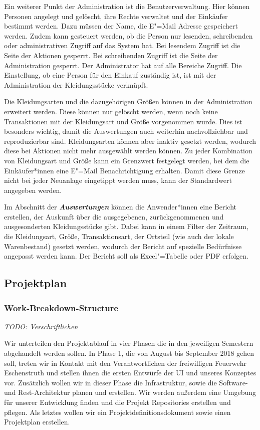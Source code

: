 Ein weiterer Punkt der Administration ist die Benutzerverwaltung. Hier können Personen angelegt und gelöscht, ihre Rechte verwaltet und der Einkäufer bestimmt werden. Dazu müssen der Name, die E"=Mail Adresse gespeichert werden. Zudem kann gesteuert werden, ob die Person nur lesenden, schreibenden oder administrativen Zugriff auf das System hat. Bei lesendem Zugriff ist die Seite der Aktionen gesperrt. Bei schreibenden Zugriff ist die Seite der Administration gesperrt. Der Administrator hat auf alle Bereiche Zugriff. Die Einstellung, ob eine Person für den Einkauf zuständig ist, ist mit der Administration der Kleidungsstücke verknüpft. 

Die Kleidungsarten und die dazugehörigen Größen können in der Administration erweitert werden. Diese können nur gelöscht werden, wenn noch keine Transaktionen mit der Kleidungsart und Größe vorgenommen wurde. Dies ist besonders wichtig, damit die Auswertungen auch weiterhin nachvollziehbar und reproduzierbar sind. Kleidungsarten können aber inaktiv gesetzt werden, wodurch diese bei Aktionen nicht mehr ausgewählt werden können. Zu jeder Kombination von Kleidungsart und Größe kann ein Grenzwert festgelegt werden, bei dem die Einkäufer*innen eine E"=Mail Benachrichtigung erhalten. Damit diese Grenze nicht bei jeder Neuanlage eingetippt werden muss, kann der Standardwert angegeben werden.

Im Abschnitt der \textit{\textbf{Auswertungen}} können die Anwender*innen eine Bericht erstellen, der Auskunft über die ausgegebenen, zurückgenommenen und ausgesonderten Kleidungsstücke gibt. Dabei kann in einem Filter der Zeitraum, die Kleidungsart, Größe, Transaktionsart, der Ortsteil (wie auch der lokale Warenbestand) gesetzt werden, wodurch der Bericht auf spezielle Bedürfnisse angepasst werden kann. Der Bericht soll als Excel"=Tabelle oder PDF erfolgen.

\subsection{Projektplan}
\subsubsection{Work-Breakdown-Structure}\label{sec:wbs}

\textit{TODO: Verschriftlichen}

Wir unterteilen den Projektablauf in vier Phasen die in den jeweiligen Semestern abgehandelt werden sollen. In Phase 1, die von August bis September 2018 gehen soll, treten wir in Kontakt mit den Verantwortlichen der freiwilligen Feuerwehr Eschenstruth und stellen ihnen die ersten Entwürfe der UI und unseres Konzeptes vor.
Zusätzlich wollen wir in dieser Phase die Infrastruktur, sowie die Software- und Rest-Architektur planen und erstellen. Wir werden außerdem eine Umgebung für unserer Entwicklung finden und die Projekt Repositories erstellen und pflegen.
Als letztes wollen wir ein Projektdefinitionsdokument sowie einen Projektplan erstellen.

